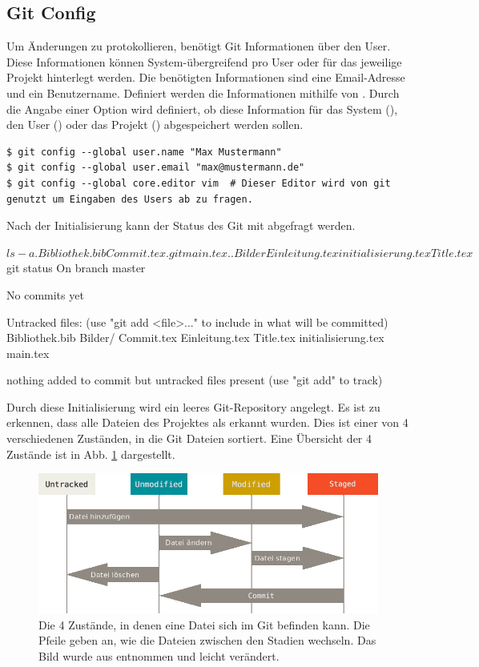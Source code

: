 \subsection{Git Config}
Um Änderungen zu protokollieren, benötigt Git Informationen über den User. Diese Informationen können System-übergreifend pro User oder für das jeweilige Projekt hinterlegt werden. Die benötigten Informationen sind eine Email-Adresse und ein Benutzername. Definiert werden die Informationen mithilfe von . Durch die Angabe einer Option wird definiert, ob diese Information für das System (), den User () oder das Projekt () abgespeichert werden sollen.
\begin{lstlisting}[breaklines=true]
$ git config --global user.name "Max Mustermann"
$ git config --global user.email "max@mustermann.de"
$ git config --global core.editor vim  # Dieser Editor wird von git genutzt um Eingaben des Users ab zu fragen.
\end{lstlisting}
Nach der Initialisierung kann der Status des Git mit  abgefragt werden.
\begin{mplisting}
$ ls -a
.   Bibliothek.bib  Commit.tex      .git                 main.tex
..  Bilder          Einleitung.tex  initialisierung.tex  Title.tex
$ git status
On branch master

No commits yet

Untracked files:
  (use "git add <file>..." to include in what will be committed)
	Bibliothek.bib
	Bilder/
	Commit.tex
	Einleitung.tex
	Title.tex
	initialisierung.tex
	main.tex

nothing added to commit but untracked files present (use "git add" to track)

\end{mplisting}
Durch diese Initialisierung wird ein leeres Git-Repository angelegt. 
Es ist zu erkennen, dass alle Dateien des Projektes als  erkannt wurden. Dies ist einer von 4 verschiedenen Zuständen, in die Git Dateien sortiert. Eine Übersicht der 4 Zustände ist in Abb. \ref{fig:lifecycle} dargestellt.
\begin{figure}[!h]
	\centering
	\includegraphics[width=\textwidth]{Bilder/lifecycle_de.png}
	\caption{Die 4 Zustände, in denen eine Datei sich im Git befinden kann. Die Pfeile geben an, wie die Dateien zwischen den Stadien wechseln. Das Bild wurde aus \cite{ProGit} entnommen und leicht verändert.}
	\label{fig:lifecycle}
\end{figure}

